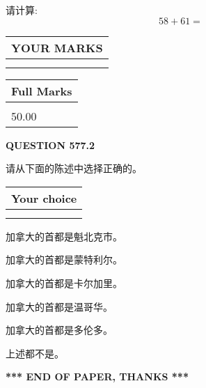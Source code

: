 \documentclass{ctexart}
\begin{document}
  
 
请计算:
\begin{equation}
58 +  %
61 = \nonumber
\end{equation}
 

 

 
  
\vspace{0.2in}
  
\noindent\begin{tabular}{|l|}
\hline
 YOUR MARKS  \\
\hline
 \\ 
 \\ 
\hline
\end{tabular}
\hspace{0.05in} \begin{tabular}{|l|}
\hline
 Full Marks  \\
\hline
 \\ 
50.00 \\
\hline
\end{tabular}
{\textbf{\Large{QUESTION
577.2 
}}}
  
  
请从下面的陈述中选择正确的。
  
  
\noindent\hspace{3.0in} \begin{tabular}{|l|}
\hline
Your choice \\
\hline
 \\ 
 \\ 
\hline
\end{tabular}
  
  
 
 
加拿大的首都是魁北克市。
 
 
加拿大的首都是蒙特利尔。
 
 
加拿大的首都是卡尔加里。
 
 
加拿大的首都是温哥华。
 
 
加拿大的首都是多伦多。
 
 
 上述都不是。
 
 
   
   
 \vspace{0.2in}
 
   
   
   
   
\vspace{1.0in} 
{\textbf{\large{ *** END OF PAPER, THANKS *** }}} 
   
\end{document}
